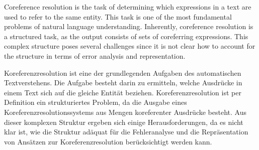 
\addchap*{\abstractname}

Coreference resolution \cite{danes74a} is the task of determining which expressions in a text are used to refer to the same entity. This task is one of the most fundamental problems of natural language understanding. Inherently, coreference resolution is a structured task, as the output consists of sets of coreferring expressions. This complex structure poses several challenges since it is not clear how to account for the structure in terms of error analysis and representation.


\addchap*{\abstractname}

Koreferenzresolution ist eine der grundlegenden Aufgaben des automatischen Textverstehens. Die Aufgabe besteht darin zu ermitteln, welche Ausdrücke in einem Text sich auf die gleiche Entität beziehen. Koreferenzresolution ist per Definition ein strukturiertes Problem, da die Ausgabe eines Koreferenzresolutionssystems aus Mengen koreferenter Ausdrücke besteht. Aus dieser komplexen Struktur ergeben sich einige Herausforderungen, da es nicht klar ist, wie die Struktur adäquat für die Fehleranalyse und die Repräsentation von Ansätzen zur Koreferenzresolution berücksichtigt werden kann.

